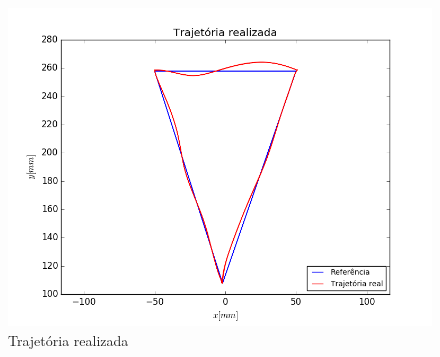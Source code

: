 \documentclass[]{politex}
\begin{document}
\begin{figure}[H]
	\centering
	\includegraphics[scale=0.39]{../../../Experimental/Aquisicoes/PIDx_triangulo/xy.png}  
	\caption{Trajetória realizada}
	\label{fig:PIDx_triangulo_xy}
\end{figure}
\end{document}
